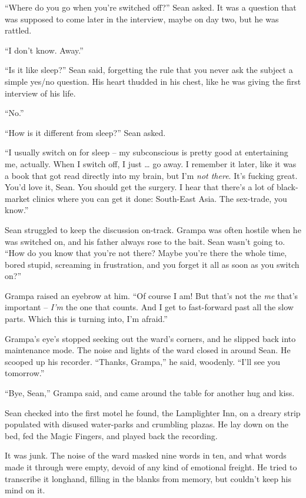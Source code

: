“Where do you go when you're switched off?” Sean asked. It was a 
question that was supposed to come later in the interview, maybe on day 
two, but he was rattled.

“I don't know. Away.”

“Is it like sleep?” Sean said, forgetting the rule that you never 
ask the subject a simple yes/no question. His heart thudded in his 
chest, like he was giving the first interview of his life.

“No.”

“How is it different from sleep?” Sean asked.

“I usually switch on for sleep -- my subconscious is pretty good at 
entertaining me, actually. When I switch off, I just \ldots{} go away. I 
remember it later, like it was a book that got read directly into my 
brain, but I'm \emph{not there}. It's fucking great. You'd love it, 
Sean. You should get the surgery. I hear that there's a lot of 
black-market clinics where you can get it done: South-East Asia. The 
sex-trade, you know.”

Sean struggled to keep the discussion on-track. Grampa was often 
hostile when he was switched on, and his father always rose to the 
bait. Sean wasn't going to. “How do you know that you're not there? 
Maybe you're there the whole time, bored stupid, screaming in 
frustration, and you forget it all as soon as you switch on?”

Grampa raised an eyebrow at him. “Of course I am! But that's not the 
\emph{me} that's important -- \emph{I'm} the one that counts. And I get 
to fast-forward past all the slow parts. Which this is turning into, 
I'm afraid.”

Grampa's eye's stopped seeking out the ward's corners, and he slipped 
back into maintenance mode. The noise and lights of the ward closed in 
around Sean. He scooped up his recorder. “Thanks, Grampa,” he said, 
woodenly. “I'll see you tomorrow.”

“Bye, Sean,” Grampa said, and came around the table for another hug 
and kiss.

\tb

Sean checked into the first motel he found, the Lamplighter Inn, on a 
dreary strip populated with disused water-parks and crumbling plazas. 
He lay down on the bed, fed the Magic Fingers, and played back the 
recording.

It was junk. The noise of the ward masked nine words in ten, and what 
words made it through were empty, devoid of any kind of emotional 
freight. He tried to transcribe it longhand, filling in the blanks from 
memory, but couldn't keep his mind on it.

